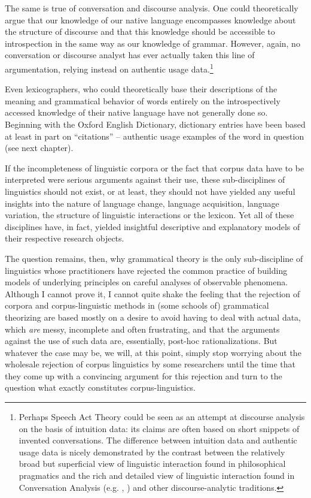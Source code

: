 The same is true of conversation and discourse analysis. One could theoretically argue that our knowledge of our native language encompasses knowledge about the structure of discourse and that this knowledge should be accessible to introspection in the same way as our knowledge of grammar. However, again, no conversation or discourse analyst has ever actually taken this line of argumentation, relying instead on authentic usage data.\footnote{Perhaps Speech Act Theory could be seen as an attempt at discourse analysis on the basis of intuition data: its claims are often based on short snippets of invented conversations. The difference between intuition data and authentic usage data is nicely demonstrated by the contrast between the relatively broad but superficial view of linguistic interaction found in philosophical pragmatics and the rich and detailed view of linguistic interaction found in Conversation Analysis (e.g. \citealt{sacks_simplest_1974}, \citealt{sacks_lectures_1992}) and other discourse-analytic traditions.} 

Even lexicographers, who could theoretically base their descriptions of the meaning and grammatical behavior of words entirely on the introspectively accessed knowledge of their native language have not generally done so. Beginning with the Oxford English Dictionary, dictionary entries have been based at least in part on ``citations'' -- authentic usage examples of the word in question (see next chapter).

If the incompleteness of linguistic corpora or the fact that corpus data have to be interpreted were serious arguments against their use, these sub-disciplines of linguistics should not exist, or at least, they should not have yielded any useful insights into the nature of language change, language acquisition, language variation, the structure of linguistic interactions or the lexicon. Yet all of these disciplines have, in fact, yielded insightful descriptive and explanatory models of their respective research objects.

The question remains, then, why grammatical theory is the only sub-discipline of linguistics whose practitioners have rejected the common practice of building models of underlying principles on careful analyses of observable phenomena. Although I cannot prove it, I cannot quite shake the feeling that the rejection of corpora and corpus-linguistic methods in (some schools of) grammatical theorizing are based mostly on a desire to avoid having to deal with actual data, which \textit{are} messy, incomplete and often frustrating, and that the arguments against the use of such data are, essentially, post-hoc rationalizations. But whatever the case may be, we will, at this point, simply stop worrying about the wholesale rejection of corpus linguistics by some researchers until the time that they come up with a convincing argument for this rejection and turn to the question what exactly constitutes corpus-linguistics.
